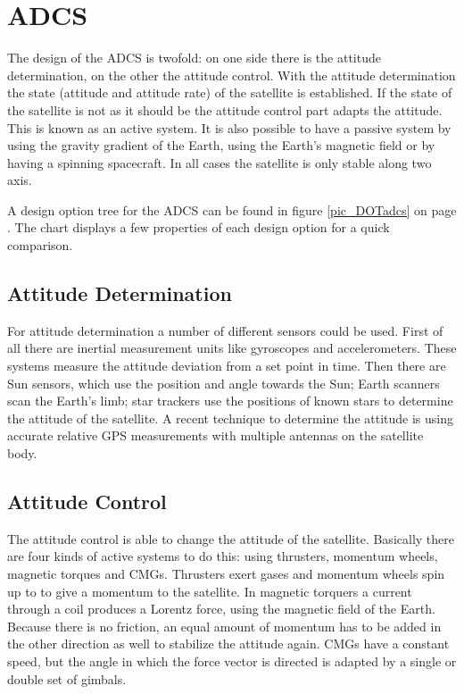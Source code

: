 \section{\acl{ADCS}}
\label{designOptionsADCS}
The design of the \ac{ADCS} is twofold: on one side there is the attitude determination, on the other the attitude control. With the attitude determination the state (attitude and attitude rate) of the satellite is established. If the state of the satellite is not as it should be the attitude control part adapts the attitude. This is known as an active system. It is also possible to have a passive system by using the gravity gradient of the Earth, using the Earth's magnetic field or by having a spinning spacecraft. In all cases the satellite is only stable along two axis. 

A design option tree for the \ac{ADCS} can be found in figure \ref{pic_DOTadcs} on page \pageref{pic_DOTadcs}. The chart displays a few properties of each design option for a quick comparison.

\subsection{Attitude Determination}
For attitude determination a number of different sensors could be used. First of all there are inertial measurement units like gyroscopes and accelerometers. These systems measure the attitude deviation from a set point in time. Then there are Sun sensors, which use the position and angle towards the Sun;  Earth scanners scan the Earth's limb; star trackers use the positions of known stars to determine the attitude of the satellite. A recent technique to determine the attitude is using accurate relative \ac{GPS} measurements with multiple antennas on the satellite body.

\subsection{Attitude Control}
The attitude control is able to change the attitude of the satellite. Basically there are four kinds of active systems to do this: using thrusters, momentum wheels, magnetic torques and \acp{CMG}. Thrusters exert gases and momentum wheels spin up to to give a momentum to the satellite. In magnetic torquers a current through a coil produces a Lorentz force, using the magnetic field of the Earth. Because there is no friction, an equal amount of momentum has to be added in the other direction as well to stabilize the attitude again. \ac{CMG}s have a constant speed, but the angle in which the force vector is directed is adapted by a single or double set of gimbals. 

